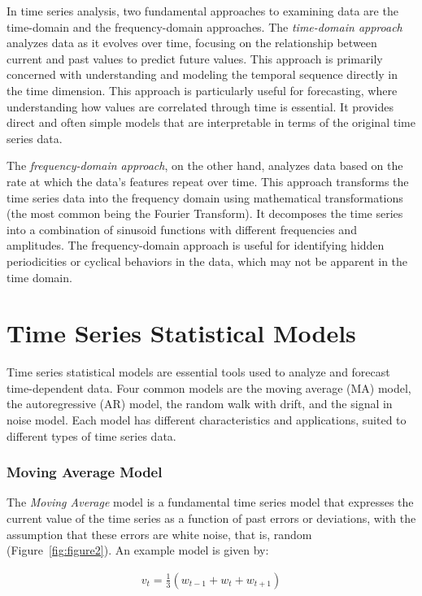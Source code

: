 In time series analysis, two fundamental approaches to examining data are the time-domain and the frequency-domain approaches. The \emph{time-domain approach} analyzes data as it evolves over time, focusing on the relationship between current and past values to predict future values. This approach is primarily concerned with understanding and modeling the temporal sequence directly in the time dimension. This approach is particularly useful for forecasting, where understanding how values are correlated through time is essential. It provides direct and often simple models that are interpretable in terms of the original time series data.

The \emph{frequency-domain approach}, on the other hand, analyzes data based on the rate at which the data's features repeat over time. This approach transforms the time series data into the frequency domain using mathematical transformations (the most common being the Fourier Transform). It decomposes the time series into a combination of sinusoid functions with different frequencies and amplitudes. The frequency-domain approach is useful for identifying hidden periodicities or cyclical behaviors in the data, which may not be apparent in the time domain.

\section{Time Series Statistical Models}

Time series statistical models are essential tools used to analyze and forecast time-dependent data. Four common models are the moving average (MA) model, the autoregressive (AR) model, the random walk with drift, and the signal in noise model. Each model has different characteristics and applications, suited to different types of time series data.

\subsubsection*{Moving Average Model}

The \emph{Moving Average} model is a fundamental time series model that expresses the current value of the time series as a function of past errors or deviations, with the assumption that these errors are white noise, that is, random (Figure~\ref{fig:figure2}). An example model is given by: 

\begin{align*}v_t = \frac{1}{3} ( w_{t-1} + w_t + w_{t+1})
\end{align*}


